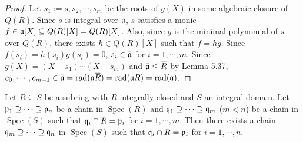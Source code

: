 \begin{proof}
    Let $s_1:=s,s_2,\cdots,s_m$ be the roots of $g(X)$ in some algebraic closure of $Q(R)$. Since $s$ is integral over $\mathfrak{a}$, $s$ satisfies a monic $f \in \mathfrak{a}[X] \subseteq Q(R)[X] = Q(R)[X]$. Also, since $g$ is the minimal polynomial of $s$ over $Q(R)$, there exists $h \in Q(R)[X]$ such that $f = hg$. Since $f(s_i) = h(s_i)g(s_i) = 0$, $s_i \in \overbar{\ffa}$ for $i = 1,\cdots,m$. Since $g(X) = (X-s_1) \cdots (X-s_m)$ and $\overbar{\ffa} \leq \overbar{R}$ by Lemma 5.37, $c_0,\cdots,c_{m-1} \in \overbar{\ffa} = \operatorname{rad}(\ffa \overbar{R}) = \operatorname{rad}(\ffa R) = \operatorname{rad}(\ffa)$. 
\end{proof}

\begin{theorem}
    Let $R \subseteq S$ be a subring with $R$ integrally closed and $S$ an integral domain. Let $\mathfrak{p}_1 \supseteq \cdots \supseteq \mathfrak{p}_n$ be a chain in $\operatorname{Spec}(R)$ and $\mathfrak{q}_1 \supseteq \cdots \supseteq \mathfrak{q}_m$ ($m < n$) be a chain in $\operatorname{Spec}(S)$ such that $\mathfrak{q}_i \cap R = \mathfrak{p}_i$ for $i = 1,\cdots,m$. Then there exists a chain $\mathfrak{q}_m \supseteq \cdots \supseteq \mathfrak{q}_n$ in $\operatorname{Spec}(S)$ such that $\mathfrak{q}_i \cap R = \mathfrak{p}_i$ for $i = 1,\cdots,n$. 
\end{theorem}

